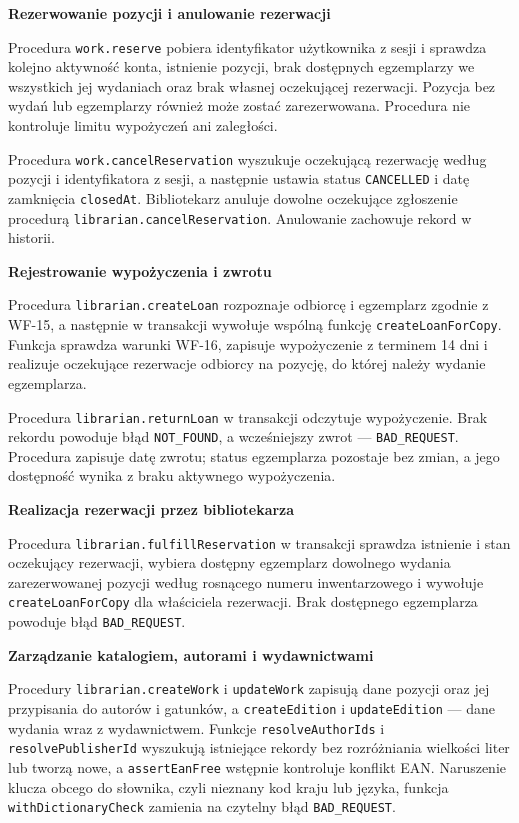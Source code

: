 \documentclass[11pt, a4paper]{article}
\begin{document}
\noindent\textbf{Rezerwowanie pozycji i anulowanie rezerwacji}

Procedura \texttt{work.reserve} pobiera identyfikator użytkownika z sesji i sprawdza kolejno aktywność konta, istnienie pozycji, brak dostępnych egzemplarzy we wszystkich jej wydaniach oraz brak własnej oczekującej rezerwacji. Pozycja bez wydań lub egzemplarzy również może zostać zarezerwowana. Procedura nie kontroluje limitu wypożyczeń ani zaległości.

Procedura \texttt{work.cancelReservation} wyszukuje oczekującą rezerwację według pozycji i identyfikatora z sesji, a następnie ustawia status \texttt{CANCELLED} i datę zamknięcia \texttt{closedAt}. Bibliotekarz anuluje dowolne oczekujące zgłoszenie procedurą \texttt{librarian.cancelReservation}. Anulowanie zachowuje rekord w historii.

\noindent\textbf{Rejestrowanie wypożyczenia i zwrotu}

Procedura \texttt{librarian.createLoan} rozpoznaje odbiorcę i egzemplarz zgodnie z WF-15, a następnie w transakcji wywołuje wspólną funkcję \texttt{createLoanForCopy}. Funkcja sprawdza warunki WF-16, zapisuje wypożyczenie z terminem 14 dni i realizuje oczekujące rezerwacje odbiorcy na pozycję, do której należy wydanie egzemplarza.

Procedura \texttt{librarian.returnLoan} w transakcji odczytuje wypożyczenie. Brak rekordu powoduje błąd \texttt{NOT\_FOUND}, a wcześniejszy zwrot --- \texttt{BAD\_REQUEST}. Procedura zapisuje datę zwrotu; status egzemplarza pozostaje bez zmian, a jego dostępność wynika z braku aktywnego wypożyczenia.

\noindent\textbf{Realizacja rezerwacji przez bibliotekarza}

Procedura \texttt{librarian.fulfillReservation} w transakcji sprawdza istnienie i stan oczekujący rezerwacji, wybiera dostępny egzemplarz dowolnego wydania zarezerwowanej pozycji według rosnącego numeru inwentarzowego i wywołuje \texttt{createLoanForCopy} dla właściciela rezerwacji. Brak dostępnego egzemplarza powoduje błąd \texttt{BAD\_REQUEST}.

\noindent\textbf{Zarządzanie katalogiem, autorami i wydawnictwami}

Procedury \texttt{librarian.createWork} i \texttt{updateWork} zapisują dane pozycji oraz jej przypisania do autorów i gatunków, a \texttt{createEdition} i \texttt{updateEdition} --- dane wydania wraz z wydawnictwem. Funkcje \texttt{resolveAuthorIds} i \texttt{resolvePublisherId} wyszukują istniejące rekordy bez rozróżniania wielkości liter lub tworzą nowe, a \texttt{assertEanFree} wstępnie kontroluje konflikt EAN. Naruszenie klucza obcego do słownika, czyli nieznany kod kraju lub języka, funkcja \texttt{withDictionaryCheck} zamienia na czytelny błąd \texttt{BAD\_REQUEST}.
\end{document}
